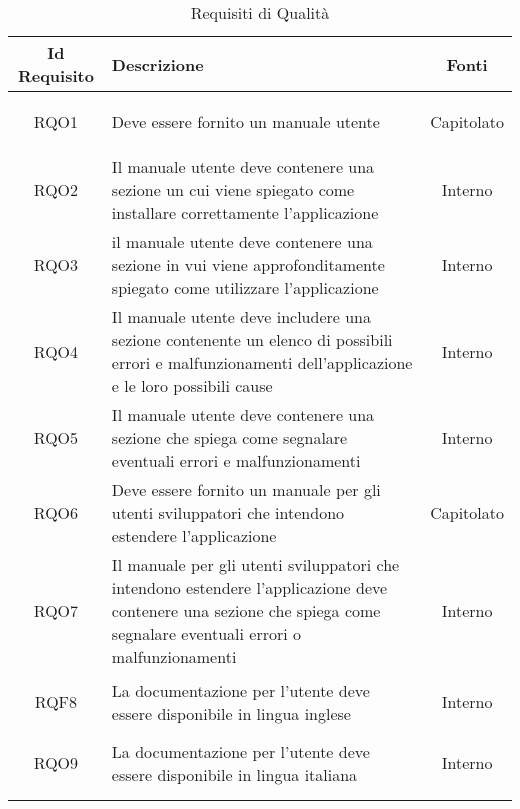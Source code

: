 \begin{longtable}{|c|>{\centering}m{7cm}|c|}
\hline
\textbf{Id Requisito} & \textbf{Descrizione} & \textbf{Fonti}\\
\hline
\endhead
\hypertarget{RQO1}{RQO1} & Deve essere fornito un manuale utente & Capitolato
\\ \hline

\hypertarget{RQO2}{RQO2} & Il manuale utente deve contenere una sezione un cui viene spiegato come installare correttamente l'applicazione & Interno
\\ \hline

\hypertarget{RQO3}{RQO3} & il manuale utente deve contenere una sezione in vui viene approfonditamente spiegato come utilizzare l'applicazione & Interno
\\ \hline

\hypertarget{RQO4}{RQO4} & Il manuale utente deve includere una sezione contenente un elenco di possibili errori e malfunzionamenti dell'applicazione e le loro possibili cause & Interno
\\ \hline

\hypertarget{RQO5}{RQO5} & Il manuale utente deve contenere una sezione che spiega come segnalare eventuali errori e malfunzionamenti & Interno
\\ \hline

\hypertarget{RQO6}{RQO6} & Deve essere fornito un manuale per gli utenti sviluppatori che intendono estendere l'applicazione & Capitolato
\\ \hline

\hypertarget{RQO7}{RQO7} & Il manuale per gli utenti sviluppatori che intendono estendere l'applicazione deve contenere una sezione che spiega come segnalare eventuali errori o malfunzionamenti & Interno
\\ \hline

\hypertarget{RQF8}{RQF8} & La documentazione per l'utente deve essere disponibile in lingua inglese & Interno
\\ \hline

\hypertarget{RQO9}{RQO9} & La documentazione per l'utente deve essere disponibile in lingua italiana & Interno
\\ \hline

\caption[Requisiti di Qualità]{Requisiti di Qualità}
\label{tabella:req2}
\end{longtable}
\clearpage
